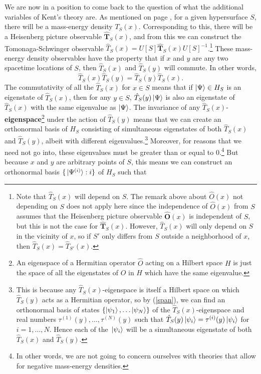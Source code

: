 We are now in a position to come back to the question of what the additional variables of Kent's theory are. As mentioned on page \pageref{massenergydensity}, for a given hypersurface $S$,  there will be a mass-energy density $T_S(x)$. Corresponding to this, there will be a Heisenberg picture observable $\hat{\bm{T}}_S(x)$, and from this we can construct the Tomonaga-Schwinger observable $\hat{T}_S(x)=U[S]\hat{\bm{T}}_S(x)U[S]^{-1}$.\footnote{Note that $\hat{T}_S(x)$ will depend on $S$. The remark above about $\hat{O}(x)$ not depending on $S$ does not apply here since the independence of $\hat{O}(x)$ from $S$ assumes that the Heisenberg picture observable $\hat{\bm{O}}(x)$ is independent of $S$, but this is not the case for  $\hat{\bm{T}}_S(x)$. However,  $\hat{T}_S(x)$ will only depend on $S$ in the vicinity of $x$, so if $S'$ only differs from $S$ outside a neighborhood of $x$, then $\hat{T}_S(x) =\hat{T}_{S'}(x)$.} These mass-energy density observables have the property that if $x$ and $y$ are any two spacetime locations of $S$, then $\hat{T}_S(x)$ and $\hat{T}_S(y)$ will commute. In other words,
$$\hat{T}_S(x)\hat{T}_S(y)=\hat{T}_S(y)\hat{T}_S(x).$$
The commutativity of all the $\hat{T}_S(x)$ for $x\in S$ means that if $\ket{\Psi}\in H_S$ is an eigenstate of $\hat{T}_S(x)$, then for any $y\in S$, $\hat{T}_S(y)\ket{\Psi}$ is also an eigenstate of  $\hat{T}_S(x)$ with the same eigenvalue as $\ket{\Psi}$. The invariance of any $\hat{T}_S(x)$-\textbf{eigenspace}\footnote{An eigenspace of a Hermitian operator $\hat{O}$ acting on a Hilbert space $H$ is just the space of all the eigenstates of $\hat{O}$ in $H$ which have the same eigenvalue.} under the action of   $\hat{T}_S(y)$ means that we can create an orthonormal basis of $H_S$ consisting of simultaneous eigenstates of both  $\hat{T}_S(x)$ and  $\hat{T}_S(y)$, albeit with different eigenvalues.\footnote{This is because any $\hat{T}_S(x)$-eigenspace is itself a Hilbert space on which $\hat{T}_S(y)$ acts as a Hermitian operator, so by (\ref{span}), we can find an orthonormal basis of states $\{\ket{\psi_1},\ldots\ket{\psi_N}\}$ of the $\hat{T}_S(x)$-eigenspace and real numbers $\tau^{(1)}(y),\ldots,\tau^{(N)}(y)$ such that $\hat{T}_S(y)\ket*{\psi_i}=\tau^{(i)}(y)\ket*{\psi_i}$ for $i=1,\ldots,N.$ Hence each of the $\ket*{\psi_i}$ will be a simultaneous eigenstate of both $\hat{T}_S(x)$ and $\hat{T}_S(y)$.} Moreover, for reasons that we need not go into, these eigenvalues must be greater than or equal to $0$.\footnote{In other words, we are not going to concern ourselves with theories that allow for negative mass-energy densities.} But because $x$ and $y$ are arbitrary points of $S$, this means  we can construct an orthonormal basis $\{\ket*{\Psi^{(i)}}:i\}$ of $H_S$ such that
